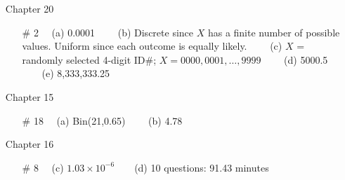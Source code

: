 \documentclass[12pt]{article}
\begin{document}
\begin{itemize}
\item[] Chapter 20           \label{ANS_20}
	\begin{itemize}
	\item[\# 2]   \ \  (a) 0.0001  \ \ \ \ (b) Discrete since $X$ has a finite number of possible values. Uniform since each outcome is equally likely. \ \ \ \   (c) $X$ = randomly selected 4-digit ID\#; $X=0000,0001,\ldots,9999$   \ \ \ \ (d) 5000.5 \ \ \ \  (e) 8,333,333.25
	\end{itemize}

\item[] Chapter 15           \label{ANS_15}
	\begin{itemize}
	\item[\# 18]   \ \  (a) Bin(21,0.65)  \ \ \ \ (b) 4.78 \ \ \ \ 
	\end{itemize}

\item[] Chapter 16           \label{ANS_16}
	\begin{itemize}
	\item[ \# 8]  \ \  (c)   $1.03\times 10^{-6}$\ \ \ \ (d)  10 questions: 91.43 minutes\ \ \ \ 
	\end{itemize}


\end{itemize}
\end{document}
